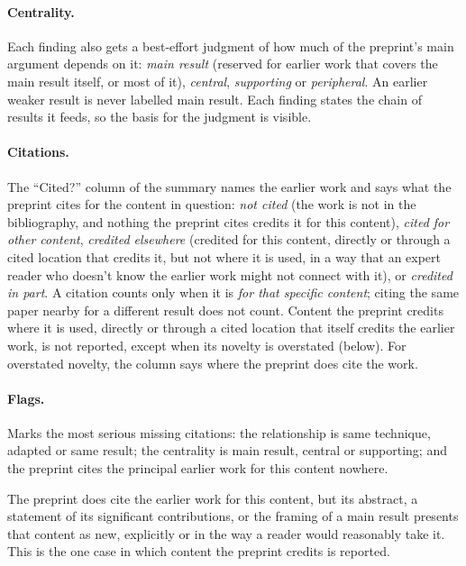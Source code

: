 \documentclass[11pt]{article}
\newcounter{finding}
\begin{document}
\paragraph{Centrality.}
Each finding also gets a best-effort judgment of how much of the preprint's
main argument depends on it: \emph{main result} (reserved for earlier work that
covers the main result itself, or most of it), \emph{central},
\emph{supporting} or \emph{peripheral}. An earlier weaker result is never
labelled main result. Each finding states the chain of results it feeds, so
the basis for the judgment is visible.

\paragraph{Citations.}
The ``Cited?'' column of the summary names the earlier work and says what the
preprint cites for the content in question: \emph{not cited} (the work is not
in the bibliography, and nothing the preprint cites credits it for this
content), \emph{cited for other content}, \emph{credited elsewhere} (credited
for this content, directly or through a cited location that credits it, but
not where it is used, in a way that an expert reader who doesn't know the earlier work might not connect with it), or \emph{credited in part}. A citation counts only when it is \emph{for that specific content};
citing the same paper nearby for a different result does not count. Content
the preprint credits where it is used, directly or through a cited location
that itself credits the earlier work, is not reported, except when its novelty is overstated (below). For
overstated novelty, the column says where the preprint does cite the work.

\paragraph{Flags.}
\begin{description}[leftmargin=1.5em,font=\normalfont\bfseries]
\item[Attribution gap.] Marks the most serious missing citations: the
relationship is same technique, adapted or same result; the centrality is main
result, central or supporting; and the preprint cites the principal earlier
work for this content nowhere.
\item[Overstated novelty.] The preprint does cite the earlier work for this
content, but its abstract, a statement of its significant contributions, or the framing of
a main result presents that content as new, explicitly or in the way a reader
would reasonably take it. This is the one case in which content the preprint
credits is reported.
\end{description}
\end{document}
